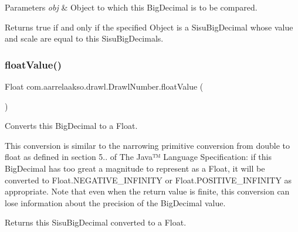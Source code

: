 \begin{DoxyParams}{Parameters}
{\em obj} & Object to which this Big\+Decimal is to be compared. \\
\hline
\end{DoxyParams}
\begin{DoxyReturn}{Returns}
true if and only if the specified Object is a Sisu\+Big\+Decimal whose value and scale are equal to this Sisu\+Big\+Decimal\textquotesingle{}s. 
\end{DoxyReturn}
\mbox{\label{classcom_1_1aarrelaakso_1_1drawl_1_1_drawl_number_ae8442cbd5cc7ab0c35c0302b196b3819}} 
\subsubsection{\texorpdfstring{float\+Value()}{floatValue()}}
{\footnotesize\ttfamily Float com.\+aarrelaakso.\+drawl.\+Drawl\+Number.\+float\+Value (\begin{DoxyParamCaption}{ }\end{DoxyParamCaption})\hspace{0.3cm}{\ttfamily [protected]}}



Converts this Big\+Decimal to a Float. 

This conversion is similar to the narrowing primitive conversion from double to float as defined in section 5.. of The Java™ Language Specification\+: if this Big\+Decimal has too great a magnitude to represent as a Float, it will be converted to Float.\+N\+E\+G\+A\+T\+I\+V\+E\+\_\+\+I\+N\+F\+I\+N\+I\+TY or Float.\+P\+O\+S\+I\+T\+I\+V\+E\+\_\+\+I\+N\+F\+I\+N\+I\+TY as appropriate. Note that even when the return value is finite, this conversion can lose information about the precision of the Big\+Decimal value.

\begin{DoxyReturn}{Returns}
this Sisu\+Big\+Decimal converted to a Float. 
\end{DoxyReturn}
\mbox{\label{classcom_1_1aarrelaakso_1_1drawl_1_1_drawl_number_a0048361007923e4b902a4581eb9ba45c}} 
